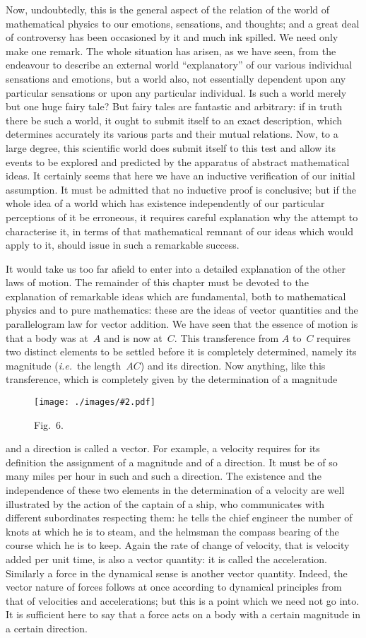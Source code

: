 \documentclass[12pt,leqno]{book}[2005/09/16]
\newcommand{\Graphic}[2]{%
  \phantomsection\label{fig:#2}%
  \texttt{[image: ./images/\#2.pdf]}%
}
\newcommand{\DefWidth}{4in}%
\newcommand{\Figure}[2][\DefWidth]{%
  \begin{figure}[hbt!]
    \centering
    \phantomsection\label{fig:#2}
    \Graphic{#1}{fig#2}
    \caption{Fig.~#2.}
  \end{figure}\ignorespaces%
}
\newcommand{\PageSep}[1]{\ignorespaces}
\newcommand{\ie}{\emph{i.e.}}
\begin{document}
Now, undoubtedly, this is the general aspect
of the relation of the world of mathematical
physics to our emotions, sensations, and
thoughts; and a great deal of controversy
has been occasioned by it and much ink
spilled. We need only make one remark. The
whole situation has arisen, as we have seen,
from the endeavour to describe an external
world ``explanatory'' of our various individual
sensations and emotions, but a world
\PageSep{51}
also, not essentially dependent upon any
particular sensations or upon any particular
individual. Is such a world merely but
one huge fairy tale? But fairy tales are
fantastic and arbitrary: if in truth there
be such a world, it ought to submit itself
to an exact description, which determines
accurately its various parts and their mutual
relations. Now, to a large degree, this
scientific world does submit itself to this
test and allow its events to be explored
and predicted by the apparatus of abstract
mathematical ideas. It certainly seems that
here we have an inductive verification of
our initial assumption. It must be admitted
that no inductive proof is conclusive; but
if the whole idea of a world which has
existence independently of our particular perceptions
of it be erroneous, it requires careful
explanation why the attempt to characterise
it, in terms of that mathematical remnant
of our ideas which would apply to it, should
issue in such a remarkable success.

It would take us too far afield to enter into
%
%
a detailed explanation of the other laws of
motion. The remainder of this chapter must
be devoted to the explanation of remarkable
ideas which are fundamental, both to mathematical
physics and to pure mathematics:
these are the ideas of vector quantities and
the parallelogram law for vector addition. We
\PageSep{52}
have seen that the essence of motion is that
a body was at~$A$ and is now at~$C$. This transference
from $A$ to~$C$ requires two distinct
elements to be settled before it is completely
determined, namely its magnitude (\ie\ the
length~$AC$) and its direction. Now anything,
like this transference, which is completely
given by the determination of a magnitude
\Figure[2in]{6}
and a direction is called a vector. For
example, a velocity requires for its definition
the assignment of a magnitude and of a
direction. It must be of so many miles per
hour in such and such a direction. The existence
and the independence of these two
elements in the determination of a velocity
are well illustrated by the action of the captain
of a ship, who communicates with different subordinates
respecting them: he tells the chief
engineer the number of knots at which he is
to steam, and the helmsman the compass
\PageSep{53}
bearing of the course which he is to keep.
Again the rate of change of velocity, that is
velocity added per unit time, is also a vector
quantity: it is called the acceleration. Similarly
a force in the dynamical sense is another
vector quantity. Indeed, the vector nature
of forces follows at once according to dynamical
principles from that of velocities and
accelerations; but this is a point which we
need not go into. It is sufficient here to say
that a force acts on a body with a certain
magnitude in a certain direction.
\end{document}
